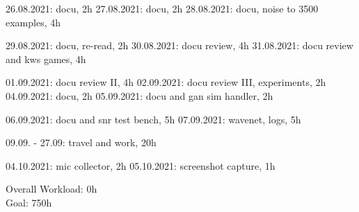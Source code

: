 26.08.2021: docu, 2h
27.08.2021: docu, 2h
28.08.2021: docu, noise to 3500 examples, 4h

29.08.2021: docu, re-read, 2h
30.08.2021: docu review, 4h
31.08.2021: docu review and kws games, 4h

01.09.2021: docu review II, 4h
02.09.2021: docu review III, experiments, 2h
04.09.2021: docu, 2h
05.09.2021: docu and gan sim handler, 2h

06.09.2021: docu and snr test bench, 5h
07.09.2021: wavenet, logs, 5h

09.09. - 27.09: travel and work, 20h

04.10.2021: mic collector, 2h
05.10.2021: screenshot capture, 1h


\vspace{0.5cm}
\noindent
Overall Workload: 0h\\
Goal: 750h